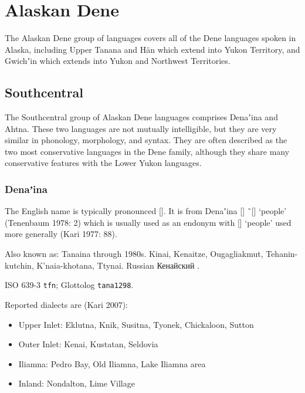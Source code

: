 \documentclass[12pt,letterpaper,oneside,article]{memoir}
\begin{document}
\section{Alaskan Dene}\label{sec:dene-alaska}

The Alaskan Dene group of languages covers all of the Dene languages spoken in Alaska, including Upper Tanana and Hän which extend into Yukon Territory, and Gwichʼin which extends into Yukon and Northwest Territories.

\subsection{Southcentral}\label{sec:dene-alaska-southcentral}

The Southcentral group of Alaskan Dene languages comprises Denaʼina and Ahtna.
These two languages are not mutually intelligible, but they are very similar in phonology, morphology, and syntax.
They are often described as the two most conservative languages in the Dene family, although they share many conservative features with the Lower Yukon languages.

\subsubsection{Denaʼina}\label{sec:denaina}

The English name  is typically pronounced []. It is from Denaʼina  [] \~\ [] ‘people’ (Tenenbaum 1978: 2) which is usually used as an endonym with  [] ‘people’ used more generally (Kari 1977: 88).

Also known as: Tanaina through 1980s.
Kinai, Kenaitze, Ougagliakmut, Tehanin-kutchin, K’naia-khotana, Ttynai.
Russian Кенайский .

ISO 639-3 \texttt{tfn}; Glottolog \texttt{tana1298}.

Reported dialects are (Kari 2007):
\begin{itemize}
\item	Upper Inlet: Eklutna, Knik, Susitna, Tyonek, Chickaloon, Sutton
\item	Outer Inlet: Kenai, Kustatan, Seldovia
\item	Iliamna: Pedro Bay, Old Iliamna, Lake Iliamna area
\item	Inland: Nondalton, Lime Village
\end{itemize}
\end{document}
